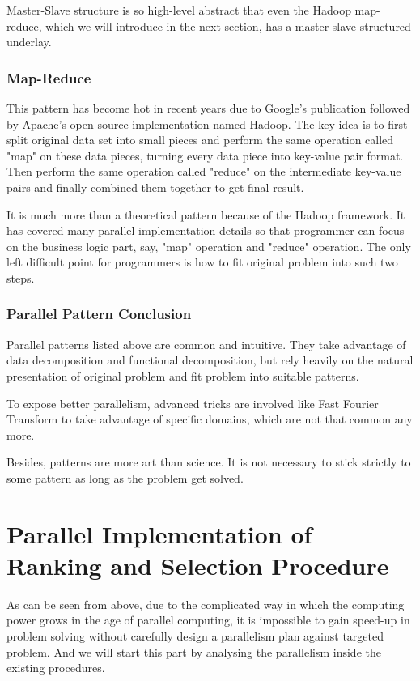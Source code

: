 \documentclass[12pt,a4]{report}
\begin{document}
Master-Slave structure is so high-level abstract that even the Hadoop map-reduce, which we will introduce in the next section, has a master-slave structured underlay.

\subsection{Map-Reduce}

This pattern has become hot in recent years due to Google's publication \cite{google-map-reduce} followed by Apache's open source implementation named Hadoop. The key idea is to first split original data set into small pieces and perform the same operation called "map" on these data pieces, turning every data piece into key-value pair format. Then perform the same operation called "reduce" on the intermediate key-value pairs and finally combined them together to get final result.

It is much more than a theoretical pattern because of the Hadoop framework. It has covered many parallel implementation details so that programmer can focus on the business logic part, say, "map" operation and "reduce" operation. The only left difficult point for programmers is how to fit original problem into such two steps.

\subsection{Parallel Pattern Conclusion}

Parallel patterns listed above are common and intuitive. They take advantage of data decomposition and functional decomposition, but rely heavily on the natural presentation of original problem and fit problem into suitable patterns.

To expose better parallelism, advanced tricks are involved like Fast Fourier Transform to take advantage of specific domains, which are not that common any more.

Besides, patterns are more art than science. It is not necessary to stick strictly to some pattern as long as the problem get solved.

\chapter{Parallel Implementation of Ranking and Selection Procedure}

As can be seen from above, due to the complicated way in which the computing power grows in the age of parallel computing, it is impossible to gain speed-up in problem solving without carefully design a parallelism plan against targeted problem. And we will start this part by analysing the parallelism inside the existing procedures.
\end{document}
